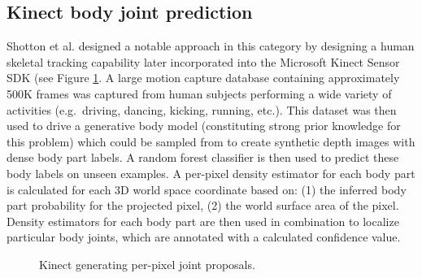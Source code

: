 \subsection{Kinect body joint prediction}
Shotton et al. \cite{kinectpaper} designed a notable approach in this category by designing a human skeletal tracking capability later incorporated into the Microsoft Kinect Sensor SDK (see Figure \ref{fig:kinect_skeleton}. A large motion capture database containing approximately 500K frames was captured from human subjects performing a wide variety of activities (e.g.\ driving, dancing, kicking, running, etc.). This dataset was then used to drive a generative body model (constituting strong prior knowledge for this problem) which could be sampled from to create synthetic depth images with dense body part labels. A random forest classifier is then used to predict these body labels on unseen examples. A per-pixel density estimator for each body part is calculated for each 3D world space coordinate based on: (1) the inferred body part probability for the projected pixel, (2) the world surface area of the pixel. Density estimators for each body part are then used in combination to localize particular body joints, which are annotated with a calculated confidence value. 

\begin{figure}[H] %
    \caption{Kinect generating per-pixel joint proposals.}
    \label{fig:kinect_skeleton}
\end{figure}

